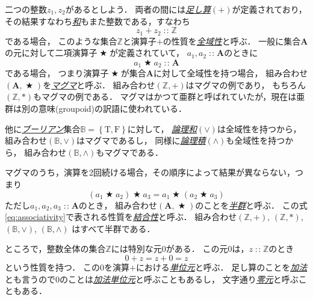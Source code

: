 \documentclass[a5paper,draft]{jsbook}
\newcommand{\keyword}[1]{{\underline{\emph{#1}}}}
\newcommand{\mathConstant}[1]{\mathrm{#1}} %
\newcommand{\mathSet}[1]{\mathbf{#1}} %
\newcommand{\mathSpecialSet}[1]{\mathbb{#1}} %
\newcommand{\mathSetWith}[1]{\left\{#1\right\}}
\newcommand{\mathTupleWith}[1]{\left(#1\right)}
\newcommand{\mathTrue}{\mathConstant{T}}
\newcommand{\mathFalse}{\mathConstant{F}}
\newcommand{\mathBinaryOperator}[1]{\operatorname{#1}}
\newcommand{\mathAnyBinaryOperator}{\mathBinaryOperator{\bigstar}}
\newcommand{\mathIn}{\mathBinaryOperator{:\!:}}
\begin{document}
二つの整数$z_1,z_2$があるとしよう．
両者の間には\keyword{足し算}$(+)$が定義されており，
その結果すなわち\keyword{和}もまた整数である，すなわち
\begin{equation}
z_1+z_2\mathIn\mathSpecialSet{Z}
\end{equation}
である場合，
このような集合$\mathSpecialSet{Z}$と演算子$+$の性質を\keyword{全域性}と呼ぶ．
一般に集合$\mathSet{A}$の元に対して二項演算子$\mathAnyBinaryOperator$が定義されていて，
$a_1,a_2\mathIn\mathSet{A}$のときに
\begin{equation}
\label{eq:totality}
a_1\mathAnyBinaryOperator a_2\mathIn\mathSet{A}
\end{equation}
である場合，
つまり演算子$\mathAnyBinaryOperator$が集合$\mathSet{A}$に対して全域性を持つ場合，
組み合わせ$\mathTupleWith{\mathSet{A},\mathAnyBinaryOperator}$を\keyword{マグマ}と呼ぶ．
組み合わせ$\mathTupleWith{\mathSpecialSet{Z},+}$はマグマの例であり，
もちろん$\mathTupleWith{\mathSpecialSet{Z},*}$もマグマの例である．
マグマはかつて亜群と呼ばれていたが，現在は亜群は別の意味(groupoid)の訳語に使われている．

他に\keyword{ブーリアン}集合$\mathSpecialSet{B}=\mathSetWith{\mathTrue,\mathFalse}$に対して，
\keyword{論理和}$(\vee)$は全域性を持つから，
組み合わせ$\mathTupleWith{\mathSpecialSet{B},\vee}$はマグマであるし，
同様に\keyword{論理積}$(\wedge)$も全域性を持つから，
組み合わせ$\mathTupleWith{\mathSpecialSet{B},\wedge}$もマグマである．

マグマのうち，演算を2回続ける場合，その順序によって結果が異ならない，つまり
\begin{equation}
\label{eq:associativity}
\left(a_1\mathAnyBinaryOperator a_2\right)\mathAnyBinaryOperator a_3
=a_1\mathAnyBinaryOperator\left(a_2\mathAnyBinaryOperator a_3\right)
\end{equation}
ただし$a_1,a_2,a_3\mathIn\mathSet{A}$のとき，
組み合わせ$\mathTupleWith{\mathSet{A},\mathAnyBinaryOperator}$のことを\keyword{半群}と呼ぶ．
この式\eqref{eq:associativity}で表される性質を\keyword{結合性}と呼ぶ．
組み合わせ$\mathTupleWith{\mathSpecialSet{Z},+}$,
$\mathTupleWith{\mathSpecialSet{Z},*}$,
$\mathTupleWith{\mathSpecialSet{B},\vee}$,
$\mathTupleWith{\mathSpecialSet{B},\wedge}$ はすべて半群である．

ところで，整数全体の集合$\mathSpecialSet{Z}$には特別な元$0$がある．
この元$0$は，$z\mathIn\mathSpecialSet{Z}$のとき
\begin{equation}
0+z=z+0=z
\end{equation}
という性質を持つ．
この$0$を演算$+$における\keyword{単位元}と呼ぶ．
足し算のことを\keyword{加法}とも言うので$0$のことは\keyword{加法単位元}と呼ぶこともあるし，
文字通り\keyword{零元}と呼ぶこともある．
\end{document}
